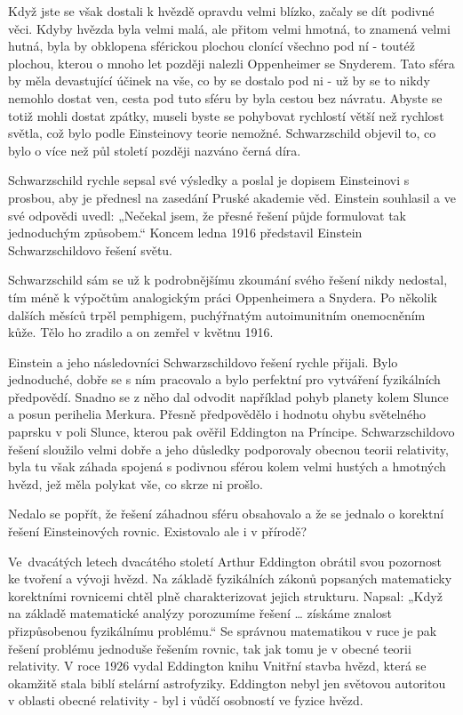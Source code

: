   Když jste se však dostali k hvězdě opravdu velmi blízko, začaly se dít podivné věci. Kdyby hvězda
  byla velmi malá, ale přitom velmi hmotná, to znamená velmi hutná, byla by obklopena sférickou
  plochou clonící všechno pod ní - toutéž plochou, kterou o mnoho let později nalezli Oppenheimer se
  Snyderem. Tato sféra by měla devastující účinek na vše, co by se dostalo pod ni - už by se to
  nikdy nemohlo dostat ven, cesta pod tuto sféru by byla cestou bez návratu. Abyste se totiž mohli
  dostat zpátky, museli byste se pohybovat rychlostí větší než rychlost světla, což bylo podle
  Einsteinovy teorie nemožné. Schwarzschild objevil to, co bylo o více než půl století později
  nazváno černá díra. 
  
  Schwarzschild rychle sepsal své výsledky a poslal je dopisem Einsteinovi s prosbou, aby je
  přednesl na zasedání Pruské akademie věd. Einstein souhlasil a ve své odpovědi uvedl: „Nečekal
  jsem, že přesné řešení půjde formulovat tak jednoduchým způsobem.“ Koncem ledna 1916 představil
  Einstein Schwarzschildovo řešení světu. 
  
  Schwarzschild sám se už k podrobnějšímu zkoumání svého řešení nikdy nedostal, tím méně k výpočtům
  analogickým práci Oppenheimera a Snydera. Po několik dalších měsíců trpěl pemphigem, puchýřnatým
  autoimunitním onemocněním kůže. Tělo ho zradilo a on zemřel v květnu 1916. 
  
  Einstein a jeho následovníci Schwarzschildovo řešení rychle přijali. Bylo jednoduché, dobře se s
  ním pracovalo a bylo perfektní pro vytváření fyzikálních předpovědí. Snadno se z něho dal odvodit
  například pohyb planety kolem Slunce a posun perihelia Merkura. Přesně předpovědělo i hodnotu
  ohybu světelného paprsku v poli Slunce, kterou pak ověřil Eddington na Príncipe. Schwarzschildovo
  řešení sloužilo velmi dobře a jeho důsledky podporovaly obecnou teorii relativity, byla tu však
  záhada spojená s podivnou sférou kolem velmi hustých a hmotných hvězd, jež měla polykat vše, co
  skrze ni prošlo. 
  
  Nedalo se popřít, že řešení záhadnou sféru obsahovalo a že se jednalo o korektní řešení
  Einsteinových rovnic. Existovalo ale i v přírodě? 
  
  Ve dvacátých letech dvacátého století Arthur Eddington obrátil svou pozornost ke tvoření a vývoji
  hvězd. Na základě fyzikálních zákonů popsaných matematicky korektními rovnicemi chtěl plně
  charakterizovat jejich strukturu. Napsal: „Když na základě matematické analýzy porozumíme řešení …
  získáme znalost přizpůsobenou fyzikálnímu problému.“ Se správnou matematikou v ruce je pak řešení
  problému jednoduše řešením rovnic, tak jak tomu je v obecné teorii relativity. V roce 1926 vydal
  Eddington knihu Vnitřní stavba hvězd, která se okamžitě stala biblí stelární astrofyziky.
  Eddington nebyl jen světovou autoritou v oblasti obecné relativity - byl i vůdčí osobností ve
  fyzice hvězd. 
  
